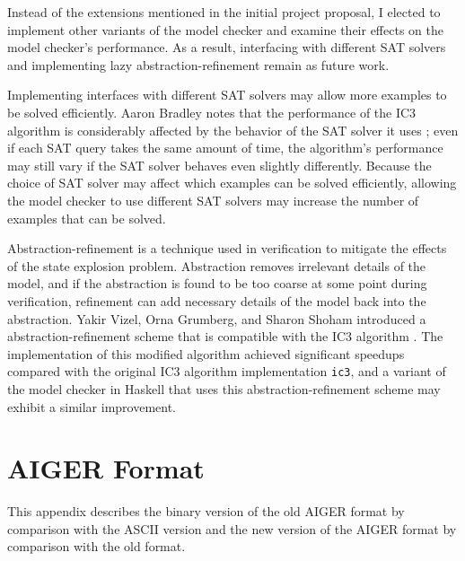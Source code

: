 \documentclass[12pt,a4paper,twoside,openright]{report}
\begin{document}
{Instead of the extensions mentioned in the initial project proposal,
I elected to implement other variants of the model checker and examine their
effects on the model checker's performance.
As a result, interfacing with different SAT solvers and implementing lazy
abstraction-refinement remain as future work.

Implementing interfaces with different SAT solvers may allow more examples to be solved efficiently.
Aaron Bradley notes that the performance of the IC3 algorithm is considerably affected
by the behavior of the SAT solver it uses \cite{bradley12}; even if each SAT query takes the same amount of
time, the algorithm's performance may still vary if the SAT solver behaves even slightly differently.
Because the choice of SAT solver may affect which examples can be solved efficiently, allowing the model
checker to use different SAT solvers may increase the number of examples that can be solved.

Abstraction-refinement is a technique used in verification to mitigate the effects
of the state explosion problem. Abstraction removes irrelevant details of the model,
and if the abstraction is found to be too coarse at some point during verification,
refinement can add necessary details of the model back into the abstraction.
Yakir Vizel, Orna Grumberg, and Sharon Shoham introduced a abstraction-refinement
scheme that is compatible with the IC3 algorithm \cite{vizel12}. The implementation
of this modified algorithm achieved significant speedups compared with the
original IC3 algorithm implementation \verb,ic3,, and a variant
of the model checker in Haskell that uses this abstraction-refinement scheme may 
exhibit a similar improvement.



\appendix

\chapter{AIGER Format}
\label{aiger}
This appendix describes the binary version of the old AIGER format by comparison
with the ASCII version and the new version of the AIGER format by
comparison with the old format.

}
\end{document}
